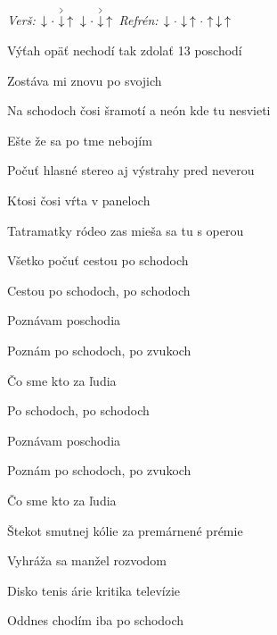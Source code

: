 \begin{song}


\begin{headerbox}
\RaiseBoxWithAccents
{} \quad
\textit{Verš:} $\Down\Miss\AccentDown\Up\ \Down\Miss\AccentDown\Up$ \quad
\textit{Refrén:} $\Down\Miss\Down\Up\Miss\Up\Down\Up$
\end{headerbox}

\begin{hchordbox}
\end{hchordbox}

\Large

\bigskip

Výťah opäť nechodí tak zdolať 13 poschodí \par
{}Zostáva mi znovu po svojich \par
Na schodoch čosi šramotí a neón kde tu nesvieti \par
{}Ešte že sa po tme nebojím \par

\bigskip

Počuť hlasné stereo aj výstrahy pred neverou \par
{}Ktosi čosi vŕta v paneloch \par
{}Tatramatky ródeo zas mieša sa tu s operou \par
{}Všetko počuť cestou po schodoch \par

\bigskip

\begin{chorusbox}{\Refren}
Cestou po schodoch, po schodoch \par
{}Poznávam poschodia \par
Poznám po schodoch, po zvukoch \par
{} Čo sme kto za ľudia \par

\bigskip

Po schodoch, po schodoch \par
{}Poznávam poschodia \par
Poznám po schodoch, po zvukoch \par
{} Čo sme kto za ľudia \par
\end{chorusbox}

\bigskip

Štekot smutnej kólie za premárnené prémie \par
{}Vyhráža sa manžel rozvodom \par
{}Disko tenis árie kritika televízie \par
{}Oddnes chodím iba po schodoch \par

\bigskip

\Refren {}

\end{song}
